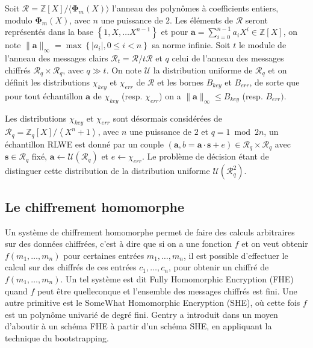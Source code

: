 \documentclass[11pt, headsepline, a4paper, fleqn, oneside]{article}
\begin{document}
Soit $\mathcal{R}=\mathbb{Z}[X] /\langle \mathbf{\Phi}_{m}(X)\rangle$ l'anneau des polynômes à coefficients entiers, modulo $\mathbf{\Phi}_{m}(X)$, avec $n$ une puissance de $2$. Les éléments de $\mathcal{R}$ seront représentés dans la base $\left\{1, X, \ldots X^{n-1}\right\}$ et pour $\boldsymbol{a}=\sum_{i=0}^{n-1} a_{i} X^{i} \in \mathbb{Z}[X]$, on note $\|\boldsymbol{a}\|_{\infty}=\max \left\{\left|a_{i}\right|, 0 \leqslant i<n\right\}$ sa norme infinie.
Soit $t$ le module de l'anneau des messages clairs $\mathcal{R}_t=\mathcal{R} /t \mathcal{R}$ et $q$ celui de l'anneau des messages chiffrés $\mathcal{R}_q\times \mathcal{R}_q$, avec $q\gg t$.
On note $\mathcal{U}$ la distribution uniforme de $\mathcal{R}_q$ et on définit les distributions $\chi_{key}$ et $\chi_{err}$ de $\mathcal{R}$ et les bornes $B_{key}$ et $B_{err}$, de sorte que pour tout échantillon $\boldsymbol{a}$ de $\chi_{key}$ (resp. $\chi_{err}$) on a $\|\boldsymbol{a}\|_{\infty} \leq B_{key}$ (resp. $B_{err})$.


Les distributions $\chi_{key}$ et $\chi_{err}$ sont désormais considérées de $\mathcal{R}_q=\mathbb{Z}_{q}[X] /\left\langle X^{n}+1\right\rangle$, avec $n$ une puissance de $2$ et $q=1\bmod 2n$, un échantillon RLWE est donné par un couple $(\boldsymbol{a}, b= \boldsymbol{a} \cdot \boldsymbol{s} + e)\in \mathcal{R}_q \times \mathcal{R}_q$ avec $\boldsymbol{s}\in \mathcal{R}_q$ fixé, $\boldsymbol{a}\leftarrow \mathcal{U}(\mathcal{R}_q)$ et $e\leftarrow \chi_{err}$. Le problème de décision étant de distinguer cette distribution de la distribution uniforme $\mathcal{U}(\mathcal{R}_q ^2)$.

\subsection{Le chiffrement homomorphe}
Un système de chiffrement homomorphe permet de faire des calculs arbitraires sur des données chiffrées, c'est à dire que si on a une fonction $f$ et on veut obtenir $f(m_1,\dots, m_n)$ pour certaines entrées $m_1,\dots, m_n$, il est possible d’effectuer le calcul sur des chiffrés de ces entrées $c_1,\dots, c_n$, pour obtenir un chiffré de $f(m_1,\dots, m_n)$. Un tel système est dit Fully Homomorphic Encryption (FHE) quand $f$ peut être quelleconque et l'ensemble des messages chiffrés est fini. Une autre primitive est le SomeWhat Homomorphic Encryption (SHE), où cette fois $f$ est un polynôme univarié de  degré fini. Gentry a introduit dans \cite{homenc} un moyen d'aboutir à un schéma FHE à partir d'un schéma SHE, en appliquant la technique du bootstrapping.
\end{document}
